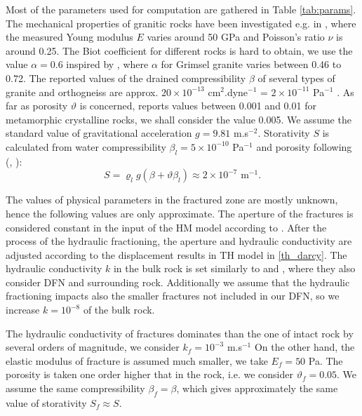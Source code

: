\documentclass{article}
\begin{document}
Most of the parameters used for computation are gathered in Table \ref{tab:params}.
The mechanical properties of granitic rocks have been investigated e.g. in \cite{Ljunggren1985}, where the measured Young modulus $E$ varies around 50 GPa and Poisson's ratio $\nu$ is around 0.25. The Biot coefficient for different rocks is hard to obtain, we use the value $\alpha=0.6$ inspired by \cite{Selvadurai2019}, where $\alpha$ for Grimsel granite varies between 0.46 to 0.72.
The reported values of the drained compressibility $\beta$ of several types of granite and orthogneiss are approx. $20\times 10^{-13}$ cm${}^2$.dyne${}^{-1}$ = $2\times10^{-11}$ Pa${}^{-1}$ \cite{Zisman1933}.
As far as porosity $\vartheta$ is concerned, \cite{intera} reports values between 0.001 and 0.01 for metamorphic crystalline rocks, we shall consider the value 0.005.
We assume the standard value of gravitational acceleration $g=9.81$ m.s${}^{-2}$.
Storativity $S$ is calculated from water compressibility $\beta_l=5\times 10^{-10}$ Pa${}^{-1}$ and porosity following (\cite{Brace1968}, \cite{intera}):
\[ S = \varrho_l g(\beta + \vartheta\beta_l) \approx 2\times 10^{-7} \mbox{ m}^{-1}. \]


The values of physical parameters in the fractured zone are mostly unknown, hence the following values are only approximate.
The aperture of the fractures is considered constant in the input of the HM model according to \cite{Honza-clanek o laborratornich mikropuklinach??}.
After the process of the hydraulic fractioning, the aperture and hydraulic conductivity are adjusted according to the displacement results in TH model in \eqref{th_darcy}.
The hydraulic conductivity $k$ in the bulk rock is set similarly to \cite{Sperl2008} and \cite{Doonechaly2016}, where they also consider DFN and surrounding rock.
Additionally we assume that the hydraulic fractioning impacts also the smaller fractures not included in our DFN,
so we increase $k=10^{-8}$ of the bulk rock.


The hydraulic conductivity of fractures dominates than the one of intact rock by several orders of magnitude, we consider $k_f=10^{-3}$ m.s${}^{-1}$
On the other hand, the elastic modulus of fracture is assumed much smaller, we take $E_f=50$ Pa.
The porosity is taken one order higher that in the rock, i.e. we consider $\vartheta_f=0.05$.
We assume the same compressibility $\beta_f=\beta$, which gives approximately the same value of storativity $S_f\approx S$.
\end{document}

